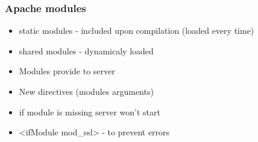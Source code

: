 \begin{frame}[fragile]
        \frametitle{Apache modules}
\begin{itemize}
    \item \alert{static modules} - included upon compilation (loaded every time)
    \item \alert{shared modules} - dynamicaly loaded 
\end{itemize}
\begin{itemize}
    \item 
	Modules provide  to server
    \item 
        New directives (modules arguments)
    \item 
	if module is missing server won't start
    \item 
	<ifModule mod\_ssl> - to prevent errors
\end{itemize}

\end{frame}
